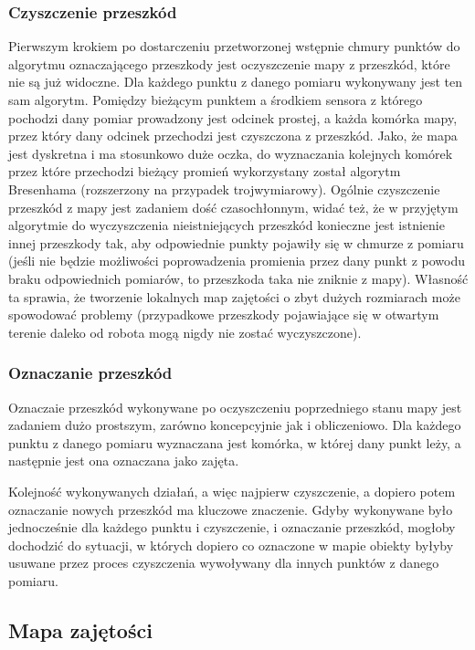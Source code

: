 \subsubsection{Czyszczenie przeszkód}

Pierwszym krokiem po dostarczeniu przetworzonej wstępnie chmury punktów do algorytmu
oznaczającego przeszkody jest oczyszczenie mapy z przeszkód, które nie są już widoczne.
Dla każdego punktu z danego pomiaru wykonywany jest ten sam algorytm. Pomiędzy
bieżącym punktem a środkiem sensora z którego pochodzi dany pomiar prowadzony jest
odcinek prostej, a każda komórka mapy, przez który dany odcinek przechodzi jest
czyszczona z przeszkód. Jako, że mapa jest dyskretna i ma stosunkowo duże oczka,
do wyznaczania kolejnych komórek przez które przechodzi bieżący promień wykorzystany
został algorytm Bresenhama (rozszerzony na przypadek trojwymiarowy). Ogólnie czyszczenie
przeszkód z mapy jest zadaniem dość czasochłonnym, widać też, że w przyjętym algorytmie
do wyczyszczenia nieistniejących przeszkód konieczne jest istnienie innej przeszkody
tak, aby odpowiednie punkty pojawiły się w chmurze z pomiaru (jeśli nie będzie możliwości
poprowadzenia promienia przez dany punkt z powodu braku odpowiednich pomiarów, to
przeszkoda taka nie zniknie z mapy). Własność ta sprawia, że tworzenie lokalnych
map zajętości o zbyt dużych rozmiarach może spowodować problemy (przypadkowe przeszkody
pojawiające się w otwartym terenie daleko od robota mogą nigdy nie zostać wyczyszczone).

\subsubsection{Oznaczanie przeszkód}

Oznaczaie przeszkód wykonywane po oczyszczeniu poprzedniego stanu mapy jest zadaniem
dużo prostszym, zarówno koncepcyjnie jak i obliczeniowo. Dla każdego punktu z danego
pomiaru wyznaczana jest komórka, w której dany punkt leży, a następnie jest ona
oznaczana jako zajęta.

Kolejność wykonywanych działań, a więc najpierw czyszczenie, a dopiero potem
oznaczanie nowych przeszkód ma kluczowe znaczenie. Gdyby wykonywane było jednocześnie
dla każdego punktu i czyszczenie, i oznaczanie przeszkód, mogłoby dochodzić do
sytuacji, w których dopiero co oznaczone w mapie obiekty byłyby usuwane przez proces
czyszczenia wywoływany dla innych punktów z danego pomiaru.


\subsection{Mapa zajętości}

